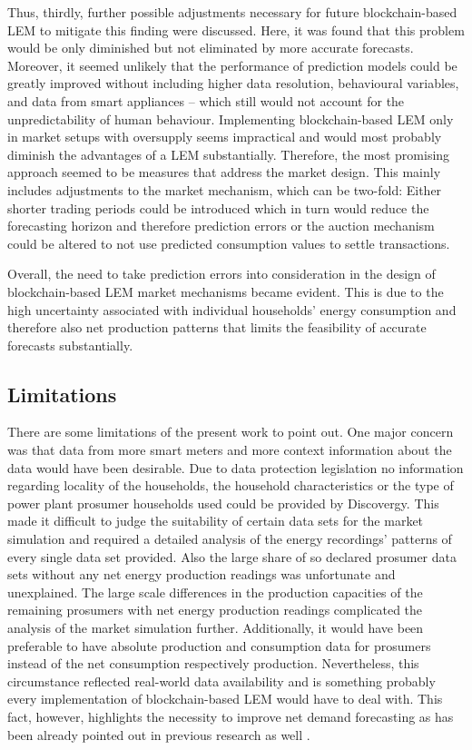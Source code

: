 Thus, thirdly, further possible adjustments necessary for future blockchain-based LEM to mitigate this finding were discussed. Here, it was found that this problem would be only diminished but not eliminated by more accurate forecasts. Moreover, it seemed unlikely that the performance of prediction models could be greatly improved without including higher data resolution, behavioural variables, and data from smart appliances -- which still would not account for the unpredictability of human behaviour. Implementing blockchain-based LEM only in market setups with oversupply seems impractical and would most probably diminish the advantages of a LEM substantially. Therefore, the most promising approach seemed to be measures that address the market design. This mainly includes adjustments to the market mechanism, which can be two-fold: Either shorter trading periods could be introduced which in turn would reduce the forecasting horizon and therefore prediction errors or the auction mechanism could be altered to not use predicted consumption values to settle transactions.

Overall, the need to take prediction errors into consideration in the design of blockchain-based LEM market mechanisms became evident. This is due to the high uncertainty associated with individual households' energy consumption and therefore also net production patterns that limits the feasibility of accurate forecasts substantially.




\subsection{Limitations}\label{Sec:Conclusion;Subsec:Discussion}

There are some limitations of the present work to point out. One major concern was that data from more smart meters and more context information about the data would have been desirable. Due to data protection legislation no information regarding locality of the households, the household characteristics or the type of power plant prosumer households used could be provided by Discovergy. This made it difficult to judge the suitability of certain data sets for the market simulation and required a detailed analysis of the energy recordings' patterns of every single data set provided. Also the large share of so declared prosumer data sets without any net energy production readings was unfortunate and unexplained. The large scale differences in the production capacities of the remaining prosumers with net energy production readings complicated the analysis of the market simulation further. Additionally, it would have been preferable to have absolute production and consumption data for prosumers instead of the net consumption respectively production. Nevertheless, this circumstance reflected real-world data availability and is something probably every implementation of blockchain-based LEM would have to deal with. This fact, however, highlights the necessity to improve net demand forecasting as has been already pointed out in previous research as well \citep[e.g.,][]{Meer:2018, Hong:2016}.

